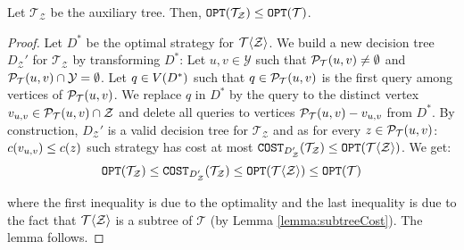 

\begin{lemma}\label{auxTreeCostLemma}
    Let $\mathcal{T}_{\mathcal{Z}}$ be the auxiliary tree. Then, $\texttt{OPT}\mathopen{}\left( \mathcal{T}_{\mathcal{Z}} \right)\leq \texttt{OPT}\mathopen{}\left( \mathcal{T} \right)$.
    \begin{proof}
        Let $D^*$ be the optimal strategy for $\mathcal{T}\mathopen{}\langle \mathcal{Z} \rangle$. We build a new decision tree $D_{\mathcal{Z}}'$ for $\mathcal{T}_{\mathcal{Z}}$ by transforming $D^*$: Let $u,v\in \mathcal{Y}$ such that $\mathcal{P}_{\mathcal{T}}\mathopen{}\left( u, v \right)\neq\emptyset$ and $\mathcal{P}_{\mathcal{T}}\mathopen{}\left( u, v \right)\cap \mathcal{Y}=\emptyset$. Let $q\in V\mathopen{}\left( D^* \right)$ such that $q\in \mathcal{P}_{\mathcal{T}}\mathopen{}\left( u, v \right)$ is the first query among vertices of $\mathcal{P}_{\mathcal{T}}\mathopen{}\left( u, v \right)$. We replace $q$ in $D^*$ by the query to the distinct vertex $v_{u,v}\in \mathcal{P}_{\mathcal{T}}\mathopen{}\left( u, v \right)\cap \mathcal{Z}$ and delete all queries to vertices $\mathcal{P}_{\mathcal{T}}\mathopen{}\left( u, v \right)-v_{u,v}$ from $D^*$. By construction, $D_{\mathcal{Z}}'$ is a valid decision tree for $\mathcal{T}_{\mathcal{Z}}$ and as for every $z\in \mathcal{P}_{\mathcal{T}}\mathopen{}\left( u, v \right)$: $c\mathopen{}\left( v_{u,v} \right)\leq c\mathopen{}\left( z \right)$ such strategy has cost at most $\texttt{COST}_{D_{\mathcal{Z}}'}\mathopen{}\left( \mathcal{T}_{\mathcal{Z}} \right)\leq \texttt{OPT}\mathopen{}\left( \mathcal{T}\mathopen{}\langle \mathcal{Z} \rangle \right)$. We get:
        $$
        \texttt{OPT}\mathopen{}\left( \mathcal{T}_{\mathcal{Z}} \right)\leq \texttt{COST}_{D_{\mathcal{Z}}'}\mathopen{}\left( \mathcal{T}_{\mathcal{Z}} \right)\leq \texttt{OPT}\mathopen{}\left( \mathcal{T}\mathopen{}\langle \mathcal{Z} \rangle \right)\leq \texttt{OPT}\mathopen{}\left( \mathcal{T} \right)
        $$

        where the first inequality is due to the optimality and the last inequality is due to the fact that $\mathcal{T}\mathopen{}\langle \mathcal{Z} \rangle$ is a subtree of $\mathcal{T}$ (by Lemma \ref{lemma:subtreeCost}). The lemma follows.
    \end{proof}
\end{lemma}

